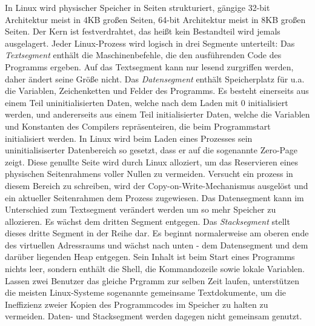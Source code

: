 \documentclass[11pt,a4paper]{article}
\begin{document}
In Linux wird physischer Speicher in Seiten strukturiert, gängige 32-bit Architektur meist in 4KB großen Seiten, 64-bit Architektur meist in 8KB großen Seiten. Der Kern ist festverdrahtet, das heißt kein Bestandteil wird jemals ausgelagert.
\newline
Jeder Linux-Prozess wird logisch in drei Segmente unterteilt: 
\newline 
Das \textit{Textsegment} enthält die Maschinenbefehle, die den ausführenden Code des Programms ergeben. Auf das Textsegment kann nur lesend zurgriffen werden, daher ändert seine Größe nicht. 
\newline
Das \textit{Datensegment} enthält Speicherplatz für u.a. die Variablen, Zeichenketten und Felder des Programms. Es besteht einerseits aus einem Teil uninitialisierten Daten, welche nach dem Laden mit 0 initialisiert werden, und andererseits aus einem Teil initialisierter Daten, welche die Variablen und Konstanten des Compilers repräsenteiren, die beim Programmstart initialisiert werden. In Linux wird beim Laden eines Prozesses sein uninitialisiserter Datenbereich so gesetzt, dass er auf die sogenannte Zero-Page zeigt. Diese genullte Seite wird durch Linux alloziert, um das Reservieren eines physischen Seitenrahmens voller Nullen zu vermeiden. Versucht ein prozess in diesem Bereich zu schreiben, wird der Copy-on-Write-Mechanismus ausgelöst und ein aktueller Seitenrahmen dem Prozess zugewiesen. Das Datensegment kann im Unterschied zum Textsegment verändert werden um so mehr Speicher zu allozieren. Es wächst dem dritten Segment entgegen.
\newline
Das \textit{Stacksegment} stellt dieses dritte Segment in der Reihe dar. Es beginnt normalerweise am oberen ende des virtuellen Adressraums und wächst nach unten - dem Datensegment und dem darüber liegenden Heap entgegen. Sein Inhalt ist beim Start eines Programms nichts leer, sondern enthält die Shell, die Kommandozeile sowie lokale Variablen. 
\newline
Lassen zwei Benutzer das gleiche Prgramm zur selben Zeit laufen, unterstützen die meisten Linux-Systeme sogenannte gemeinsame Textdokumente, um die Ineffizienz zweier Kopien des Programmcodes im Speicher zu halten zu vermeiden. Daten- und Stacksegment werden dagegen nicht gemeinsam genutzt. 

\newpage 
\end{document}
